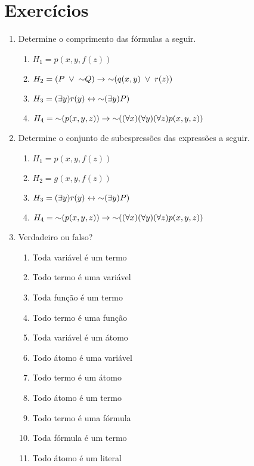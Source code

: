 \section{Exercícios}


\begin{enumerate}
  \item Determine o comprimento das fórmulas a seguir.
    \begin{enumerate}
      \item $H_1 = p(x, y, f(z))$
      \item $H_2 =  (P \;\lor\; \mathord{\sim} Q) \rightarrow \mathord{\sim}(q(x, y) \;\lor\; r(z))$
      \item $H_3 = (\exists y) r(y) \leftrightarrow \mathord{\sim} (\exists y) P)$
      \item $H_4 = \mathord{\sim}(p(x, y, z)) \rightarrow \mathord{\sim}( (\forall x) (\forall y) (\forall z) p(x, y, z))$
    \end{enumerate}
  \item Determine o conjunto de subespressões das expressões a seguir.
    \begin{enumerate}
      \item $H_1 = p(x, y, f(z))$
      \item $H_2 = g(x, y, f(z))$
      \item $H_3 = (\exists y) r(y) \leftrightarrow \mathord{\sim} (\exists y) P)$
      \item $H_4 = \mathord{\sim}(p(x, y, z)) \rightarrow \mathord{\sim}( (\forall x) (\forall y) (\forall z) p(x, y, z))$
    \end{enumerate}
  \item Verdadeiro ou falso?
    \begin{enumerate}
      \item Toda variável é um termo
      \item Todo termo é uma variável
      \item Toda função é um termo
      \item Todo termo é uma função
      \item Toda variável é um átomo
      \item Todo átomo é uma variável
      \item Todo termo é um átomo
      \item Todo átomo é um termo
      \item Todo termo é uma fórmula
      \item Toda fórmula é um termo
      \item Todo átomo é um literal

\end{enumerate}
\end{enumerate}
